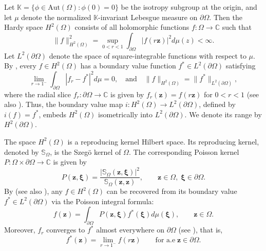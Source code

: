 \documentclass[12pt,reqno]{amsart}
\theoremstyle{remark}
\theoremstyle{definition}
\def \z{\boldsymbol{z}}
\begin{document}


Let $\mathbb K=\{\phi\in \mathrm{Aut}(\Omega): \phi(0)=0\}$ be the isotropy subgroup at the origin, and let $\mu$ denote the normalized $\mathbb K$-invariant Lebesgue measure on $\partial\Omega.$ Then the Hardy space $H^2(\Omega)$ consists of all holomorphic functions $f:\Omega\to \mathbb C$ such that  
$$\|f\|_{H^2(\Omega)}^2=\sup_{0<r<1} \int_{\partial\Omega} |f(r\z)|^2d\mu(z) <\infty.$$
Let $L^2(\partial\Omega)$ denote the space of square-integrable functions with respect to $\mu.$ By \cite[Theorem 6]{HM1969}, every $f\in H^2(\Omega)$ has a boundary value function $f^* \in L^2(\partial\Omega)$ satisfying $$\lim_{r \to 1^-} \int_{\partial\Omega}|f_r-f^*|^2 d\mu =0,\quad \text{and} \quad \|f\|_{H^2(\Omega)}=\|f^*\|_{L^2(\partial\Omega)},$$ where the radial slice  $f_r:\partial\Omega \to \mathbb C$ is given by $f_r(\z)=f(r\z)$ for $0<r<1$ (see also \cite[p. 126]{UH1996}). Thus, the boundary value map $i: H^2(\Omega) \to L^2(\partial\Omega)$, defined by $i(f)=f^*$, embeds $H^2(\Omega)$ isometrically into $L^2(\partial\Omega)$. We denote its range by $H^2(\partial\Omega)$. 

The space $H^2(\Omega)$ is a reproducing kernel Hilbert space. Its reproducing kernel, denoted by $\mathbb S_\Omega$, is the Szeg\"o kernel of $\Omega.$
The corresponding Poisson kernel $P:\Omega \times \partial\Omega  \to \mathbb C$ is given by $$P( \z, \boldsymbol \xi)=\frac{|\mathbb S_\Omega(\z, \boldsymbol \xi)|^2}{\mathbb S_\Omega(\z,\z)}, \qquad \z \in \Omega,\; \boldsymbol \xi \in \partial\Omega.$$ By \cite[Theorem 1]{HM1973} (see also \cite{KA1965}), any $f\in H^2(\Omega)$ can be recovered from its boundary value $f^* \in L^2(\partial\Omega)$ via the Poisson integral formula:
$$f(\z)=\int_{\partial\Omega}  P(\z, \boldsymbol \xi) f^*(\boldsymbol \xi)d\mu(\boldsymbol \xi), \qquad \z \in \Omega.$$
Moreover, $f_r$ converges to $f^*$ almost everywhere on $\partial\Omega$ (see \cite[Theorem 2]{WN1968}), that is,
$$f^*(\z)=\lim_{r \to 1^-} f(r\z)\qquad \text{for a.e}\; \z \in \partial \Omega.$$  
\end{document}

